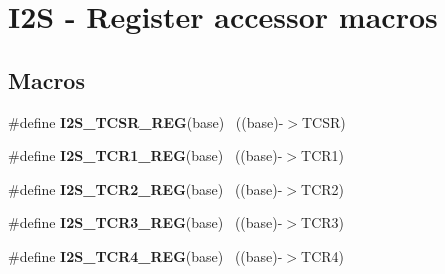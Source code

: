 \hypertarget{group___i2_s___register___accessor___macros}{}\section{I2\+S -\/ Register accessor macros}
\label{group___i2_s___register___accessor___macros}
\subsection*{Macros}
\begin{DoxyCompactItemize}
\item 
\hypertarget{group___i2_s___register___accessor___macros_gacffda7930e76dbbaf37eaa2e5392a3da}{}\#define {\bfseries I2\+S\+\_\+\+T\+C\+S\+R\+\_\+\+R\+E\+G}(base)                                          ~((base)-\/$>$T\+C\+S\+R)\label{group___i2_s___register___accessor___macros_gacffda7930e76dbbaf37eaa2e5392a3da}

\item 
\hypertarget{group___i2_s___register___accessor___macros_ga13c61275025dc7fbdca74ac8b98b0307}{}\#define {\bfseries I2\+S\+\_\+\+T\+C\+R1\+\_\+\+R\+E\+G}(base)                                          ~((base)-\/$>$T\+C\+R1)\label{group___i2_s___register___accessor___macros_ga13c61275025dc7fbdca74ac8b98b0307}

\item 
\hypertarget{group___i2_s___register___accessor___macros_ga5fb00e617bbbfcd3b1cce3ad6bdb656d}{}\#define {\bfseries I2\+S\+\_\+\+T\+C\+R2\+\_\+\+R\+E\+G}(base)                                          ~((base)-\/$>$T\+C\+R2)\label{group___i2_s___register___accessor___macros_ga5fb00e617bbbfcd3b1cce3ad6bdb656d}

\item 
\hypertarget{group___i2_s___register___accessor___macros_ga522cedd1600fdaaa70c581dfc1f624ea}{}\#define {\bfseries I2\+S\+\_\+\+T\+C\+R3\+\_\+\+R\+E\+G}(base)                                          ~((base)-\/$>$T\+C\+R3)\label{group___i2_s___register___accessor___macros_ga522cedd1600fdaaa70c581dfc1f624ea}

\item 
\hypertarget{group___i2_s___register___accessor___macros_ga3ca290e5e99bb9ca130ff9eb2980ab95}{}\#define {\bfseries I2\+S\+\_\+\+T\+C\+R4\+\_\+\+R\+E\+G}(base)                                          ~((base)-\/$>$T\+C\+R4)\label{group___i2_s___register___accessor___macros_ga3ca290e5e99bb9ca130ff9eb2980ab95}


\end{DoxyCompactItemize}

